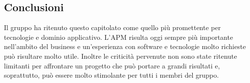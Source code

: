 	\subsection{Conclusioni}	
	Il gruppo ha ritenuto questo capitolato come quello più promettente per tecnologie e dominio applicativo. L'APM risulta oggi sempre più importante nell'ambito del business e un'esperienza con software e tecnologie molto richieste può risultare molto utile. Inoltre le criticità pervenute non sono state ritenute limitanti per affrontare un progetto che può portare a grandi risultati e, soprattutto, può essere molto stimolante per tutti i membri del gruppo.
			 